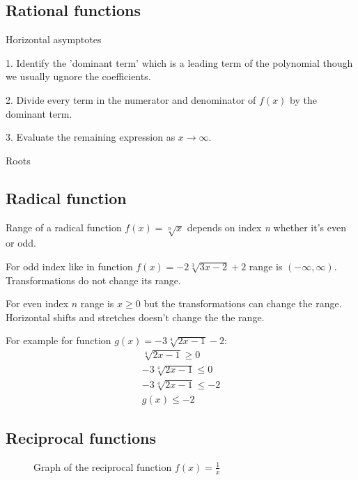 \documentclass{article}
\begin{document}
\subsection{Rational functions}
Horizontal asymptotes

1. Identify the 'dominant term' which is a leading term of the polynomial though we
usually ugnore the coefficients.

2. Divide every term in the numerator and denominator of $f(x)$ by the dominant term.

3. Evaluate the remaining expression as $x \to \infty$.


Roots


\subsection{Radical function}
Range of a radical function $f(x) = \sqrt[n]{x}$ depends on index \textit{n} whether it's even or odd.

For odd index like in function $f(x) = -2\sqrt[3]{3x-2}+2$ range is $(-\infty, \infty)$.
Transformations do not change its range.

For even index $n$ range is $x \geqslant 0$ but the transformations can change the range.
Horizontal shifts and stretches doesn't change the the range.

For example for function $g(x) = -3\sqrt[4]{2x-1}-2$:
\begin{equation}
  \begin{gathered}
  \sqrt[4]{2x-1} \geqslant 0 \\
  -3\sqrt[4]{2x-1} \leqslant 0 \\
  -3\sqrt[4]{2x-1} \leqslant -2 \\
  g(x) \leqslant -2
  \end{gathered}
\end{equation}

\subsection{Reciprocal functions}

\begin{figure}
\centering
{}
\caption{Graph of the reciprocal function $f(x) = \frac{1}{x}$}
\end{figure}
\end{document}
